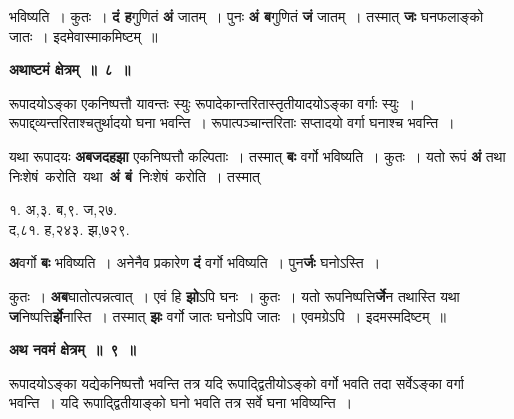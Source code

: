 \documentclass[11pt, openany]{book}
\begin{document}
\noindent भविष्यति~। कुतः~। \textbf{दं ह}गुणितं \textbf{अं} जातम्~। पुनः \textbf{अं ब}गुणितं \textbf{जं} जातम्~। तस्मात् \textbf{जः} घनफलाङ्को जातः~। इदमेवास्माकमिष्टम्~॥
\vspace{2mm}

\begin{center}
\textbf{\large अथाष्टमं क्षेत्रम्~॥~८~॥}
\end{center}

{\ab रूपादयोऽङ्का एकनिष्पत्तौ यावन्तः स्युः रूपादेकान्तरितास्तृतीयादयोऽङ्का वर्गाः स्युः~। रूपाद्द्व्यन्तरिताश्चतुर्थादयो घना भवन्ति~। रूपात्पञ्चान्तरिताः सप्तादयो वर्गा घनाश्च भवन्ति~। }

\begin{flushleft}
\begin{minipage}[t]{0.63\textwidth}
\hspace{4mm} यथा रूपादयः \textbf{अबजदहझा} एकनिष्पत्तौ कल्पिताः~। तस्मात्  \textbf{बः} वर्गो भविष्यति~। कुतः~। यतो रूपं \textbf{अं} तथा निःशेषं \,करोति \,यथा \,\textbf{अं बं} \,निःशेषं \,करोति~। तस्मात्
\end{minipage} 
\hfill
\begin{minipage}[t]{0.27\textwidth}
१. अ,३. ब,९. ज,२७.\\
द,८१. ह,२४३. झ,७२९.
\end{minipage}
\end{flushleft}
\vspace{-3mm}

\noindent  \textbf{अ}वर्गो \textbf{बः} भविष्यति~। अनेनैव प्रकारेण \textbf{दं} वर्गो भविष्यति~। पुन\textbf{र्जः} घनोऽस्ति~। 

\newpage
\noindent कुतः~। \textbf{अब}घातोत्पन्नत्वात्~। एवं हि \textbf{झो}ऽपि घनः~। कुतः~। यतो रूपनिष्पत्ति\textbf{र्जे}न तथास्ति यथा \textbf{ज}निष्पत्ति\textbf{र्झे}नास्ति~। तस्मात् \textbf{झः} वर्गो जातः घनोऽपि जातः~। एवमग्रेऽपि~। इदमस्मदिष्टम्~॥ 
\vspace{2mm}

\begin{center}
\textbf{\large अथ नवमं क्षेत्रम्~॥~९~॥}
\end{center}

 {\ab रूपादयोऽङ्का यद्येकनिष्पत्तौ भवन्ति तत्र यदि रूपाद्द्वितीयोऽङ्को वर्गो भवति तदा सर्वेऽङ्का वर्गा भवन्ति~। यदि रूपाद्द्वितीयाङ्को घनो भवति तत्र सर्वे घना भविष्यन्ति~। }
\end{document}
